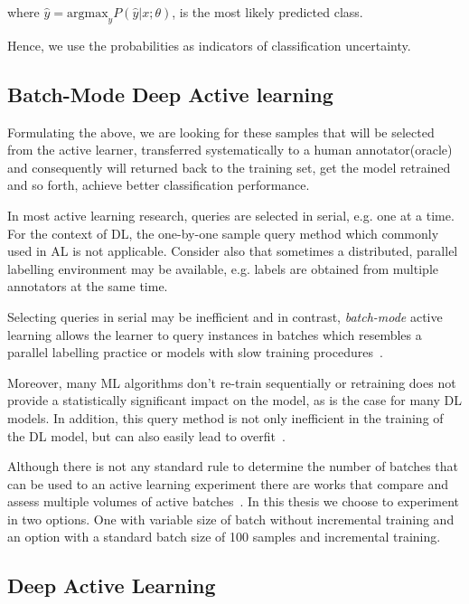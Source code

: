 where $\hat{y} = \text{argmax}_y P(\hat{y}|x;\theta)$, is the most likely predicted class. 

Hence, we use the probabilities as indicators of classification uncertainty.


\subsection{Batch-Mode Deep Active learning}
\label{c5:section_batch_mode_learning}
Formulating the above, we are looking for these samples that will be selected from the active learner, transferred systematically to a human annotator(oracle) and consequently will returned back to the training set, get the model retrained and so forth, achieve better classification performance.

In most active learning research, queries are selected in serial, e.g. one at a time. For the context of DL, the one-by-one sample query method which commonly used in AL is not applicable.
Consider also that sometimes a distributed, parallel labelling environment may be available, e.g. labels are obtained from multiple annotators at the same time.

Selecting queries in serial may be inefficient and in contrast, \textit{batch-mode} active learning allows the learner to query instances in batches which resembles a parallel labelling practice or models with slow training procedures~\cite{settles2009active}.


Moreover, many ML algorithms don't re-train sequentially or retraining does not provide a statistically significant impact on the model, as is the case for many DL models.
In addition, this query method is not only inefficient in the training of the DL model, but can also easily lead to overfit~\cite{zhdanov2019diverse}.

Although there is not any standard rule to determine the number of batches that can be used to an active learning experiment there are works that compare and assess multiple volumes of active batches~\cite{gissin2019discriminative}. In this thesis we choose to experiment in two options. One with variable size of batch without incremental training and an option with a standard batch size of 100 samples and incremental training.


\subsection{Deep Active Learning}

